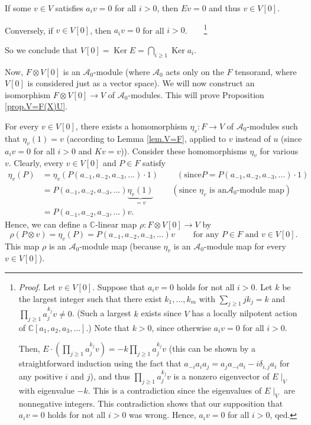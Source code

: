 \documentclass
[numbers=enddot,12pt,final,onecolumn,german,notitlepage]{scrartcl}%
\theoremstyle{definition}
\begin{document}
If some $v\in V$ satisfies $a_{i}v=0$ for all $i>0$, then $Ev=0$ and thus
$v\in V\left[  0\right]  $.

Conversely, if $v\in V\left[  0\right]  $, then $a_{i}v=0$ for all
$i>0$.\ \ \ \ \footnote{\textit{Proof.} Let $v\in V\left[  0\right]  $.
Suppose that $a_{i}v=0$ holds for not all $i>0$. Let $k$ be the largest
integer such that there exist $k_{1},...,k_{m}$ with $\sum\limits_{j\geq
1}jk_{j}=k$ and $\prod\limits_{j\geq1}a_{j}^{k_{j}}v\neq0$. (Such a largest
$k$ exists since $V$ has a locally nilpotent action of $\mathbb{C}\left[
a_{1},a_{2},a_{3},...\right]  $.) Note that $k>0$, since otherwise $a_{i}v=0$
for all $i>0$.
\par
Then, $E\cdot\left(  \prod\limits_{j\geq1}a_{j}^{k_{j}}v\right)
=-k\prod\limits_{j\geq1}a_{j}^{k_{j}}v$ (this can be shown by a
straightforward induction using the fact that $a_{-i}a_{i}a_{j}=a_{j}%
a_{-i}a_{i}-i\delta_{i,j}a_{i}$ for any positive $i$ and $j$), and thus
$\prod\limits_{j\geq1}a_{j}^{k_{j}}v$ is a nonzero eigenvector of $E\mid_{V}$
with eigenvalue $-k$. This is a contradiction since the eigenvalues of
$E\mid_{V}$ are nonnegative integers. This contradiction shows that our
supposition that $a_{i}v=0$ holds for not all $i>0$ was wrong. Hence,
$a_{i}v=0$ for all $i>0$, qed.}

So we conclude that $V\left[  0\right]  =\operatorname*{Ker}E=\bigcap
\limits_{i\geq1}\operatorname*{Ker}a_{i}$.

Now, $F\otimes V\left[  0\right]  $ is an $\mathcal{A}_{0}$-module (where
$\mathcal{A}_{0}$ acts only on the $F$ tensorand, where $V\left[  0\right]  $
is considered just as a vector space). We will now construct an isomorphism
$F\otimes V\left[  0\right]  \rightarrow V$ of $\mathcal{A}_{0}$-modules. This
will prove Proposition \ref{prop.V=F(X)U}.

For every $v\in V\left[  0\right]  $, there exists a homomorphism $\eta
_{v}:F\rightarrow V$ of $\mathcal{A}_{0}$-modules such that $\eta_{v}\left(
1\right)  =v$ (according to Lemma \ref{lem.V=F}, applied to $v$ instead of $u$
(since $a_{i}v=0$ for all $i>0$ and $Kv=v$)). Consider these homomorphisms
$\eta_{v}$ for various $v$. Clearly, every $v\in V\left[  0\right]  $ and
$P\in F$ satisfy%
\begin{align*}
\eta_{v}\left(  P\right)   &  =\eta_{v}\left(  P\left(  a_{-1},a_{-2}%
,a_{-3},...\right)  \cdot1\right)  \ \ \ \ \ \ \ \ \ \ \left(  \text{since
}P=P\left(  a_{-1},a_{-2},a_{-3},...\right)  \cdot1\right) \\
&  =P\left(  a_{-1},a_{-2},a_{-3},...\right)  \underbrace{\eta_{v}\left(
1\right)  }_{=v}\ \ \ \ \ \ \ \ \ \ \left(  \text{since }\eta_{v}\text{ is an
}\mathcal{A}_{0}\text{-module map}\right) \\
&  =P\left(  a_{-1},a_{-2},a_{-3},...\right)  v.
\end{align*}
Hence, we can define a $\mathbb{C}$-linear map $\rho:F\otimes V\left[
0\right]  \rightarrow V$ by%
\[
\rho\left(  P\otimes v\right)  =\eta_{v}\left(  P\right)  =P\left(
a_{-1},a_{-2},a_{-3},...\right)  v\ \ \ \ \ \ \ \ \ \ \text{for any }P\in
F\text{ and }v\in V\left[  0\right]  .
\]
This map $\rho$ is an $\mathcal{A}_{0}$-module map (because $\eta_{v}$ is an
$\mathcal{A}_{0}$-module map for every $v\in V\left[  0\right]  $).
\end{document}
